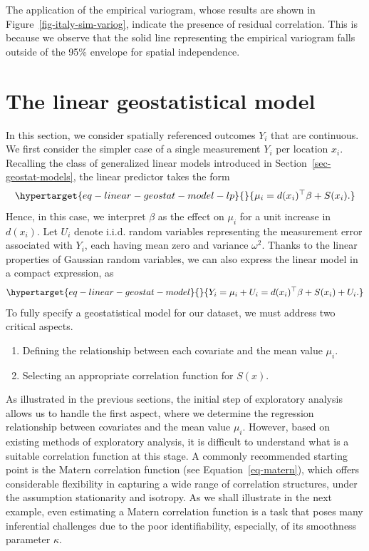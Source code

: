 \documentclass[
  letterpaper,
]{krantz}
\providecommand{\tightlist}{%
  \setlength{\itemsep}{0pt}\setlength{\parskip}{0pt}}\usepackage{longtable,booktabs,array}
\begin{document}
The application of the empirical variogram, whose results are shown in
Figure~\ref{fig-italy-sim-variog}, indicate the presence of residual
correlation. This is because we observe that the solid line representing
the empirical variogram falls outside of the 95\% envelope for spatial
independence.

\hypertarget{sec-linear-model}{%
\section{The linear geostatistical model}\label{sec-linear-model}}

In this section, we consider spatially referenced outcomes \(Y_i\) that
are continuous. We first consider the simpler case of a single
measurement \(Y_i\) per location \(x_i\). Recalling the class of
generalized linear models introduced in
Section~\ref{sec-geostat-models}, the linear predictor takes the form
\begin{equation}\protect\hypertarget{eq-linear-geostat-model-lp}{}{
\mu_{i} = d(x_i)^\top \beta + S(x_i).
}\label{eq-linear-geostat-model-lp}\end{equation} Hence, in this case,
we interpret \(\beta\) as the effect on \(\mu_i\) for a unit increase in
\(d(x_i)\). Let \(U_i\) denote i.i.d. random variables representing the
measurement error associated with \(Y_i\), each having mean zero and
variance \(\omega^2\). Thanks to the linear properties of Gaussian
random variables, we can also express the linear model in a compact
expression, as
\begin{equation}\protect\hypertarget{eq-linear-geostat-model}{}{
Y_i = \mu_i + U_i = d(x_i)^\top \beta + S(x_i) + U_i.
}\label{eq-linear-geostat-model}\end{equation} To fully specify a
geostatistical model for our dataset, we must address two critical
aspects.

\begin{enumerate}
\def\labelenumi{\arabic{enumi}.}
\tightlist
\item
  Defining the relationship between each covariate and the mean value
  \(\mu_i\).
\item
  Selecting an appropriate correlation function for \(S(x)\).
\end{enumerate}

As illustrated in the previous sections, the initial step of exploratory
analysis allows us to handle the first aspect, where we determine the
regression relationship between covariates and the mean value \(\mu_i\).
However, based on existing methods of exploratory analysis, it is
difficult to understand what is a suitable correlation function at this
stage. A commonly recommended starting point is the Matern correlation
function (see Equation~\ref{eq-matern}), which offers considerable
flexibility in capturing a wide range of correlation structures, under
the assumption stationarity and isotropy. As we shall illustrate in the
next example, even estimating a Matern correlation function is a task
that poses many inferential challenges due to the poor identifiability,
especially, of its smoothness parameter \(\kappa\).
\end{document}

